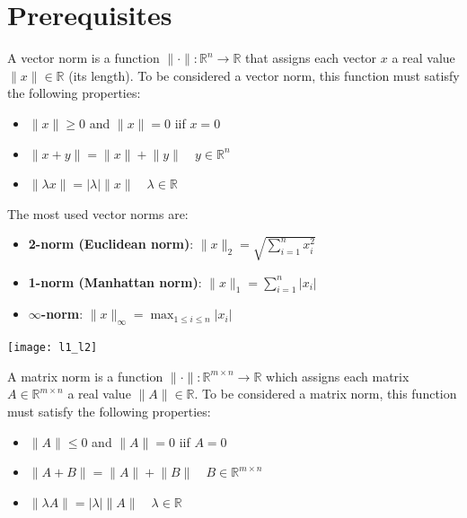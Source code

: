 \documentclass{article}
\begin{document}

\tableofcontents
\clearpage

\parindent 0pt

\section{Prerequisites}
\begin{definition}
    A vector norm is a function $\lVert \cdot\rVert:\mathbb{R}^n\to
    \mathbb{R}$ that assigns each vector $x$ a real value $\lVert x\rVert\in
    \mathbb{R}$ (its length). To be considered a vector norm, this function
    must satisfy the following properties:
    \begin{itemize}
       \item $\lVert x\rVert\geq 0$ and $\lVert x\rVert=0$
           iif $x=0$
       \item $\lVert x+y\rVert=\lVert x\rVert+ \lVert
           y\rVert \quad y\in \mathbb{R}^n$
       \item $\lVert \lambda x\rVert=\left\lvert
           \lambda\right\rvert \lVert x\rVert \quad \lambda\in \mathbb{R}$
    \end{itemize}
\end{definition}
The most used vector norms are:
\begin{itemize}
    \item \textbf{2-norm (Euclidean norm)}: $\lVert
        x\rVert_2=\sqrt{\sum_{i=1}^{n}x_i^2}$
    \item \textbf{1-norm (Manhattan norm)}: $\lVert x\rVert_1=\sum_{i=1}^{n}\left\lvert x_i\right\rvert$
    \item \textbf{$\infty$-norm}: $\lVert x\rVert_{\infty}=\max_{1\leq i\leq
        n}\left\lvert x_i\right\rvert$
\end{itemize}
\begin{center}
    \texttt{[image: l1\_l2]}
\end{center}
\begin{definition}
    A matrix norm is a function $\lVert \cdot\rVert :\mathbb{R}^{m\times n}\to
    \mathbb{R}$ which assigns each matrix $A\in \mathbb{R}^{m\times n}$ a
    real value $\lVert A\rVert\in \mathbb{R}$. To be considered a matrix norm,
    this function must satisfy the following properties:
    \begin{itemize}
        \item $\lVert A\rVert\leq 0$ and $\lVert A\rVert =0$ iif $A=0$ 
        \item $\lVert A+B\rVert=\lVert A\rVert+ \lVert
            B\rVert \quad B\in \mathbb{R}^{m\times n}$
        \item $\lVert \lambda A\rVert=\left\lvert
           \lambda\right\rvert \lVert A\rVert \quad \lambda\in \mathbb{R}$
    \end{itemize}
\end{definition}
\end{document}
